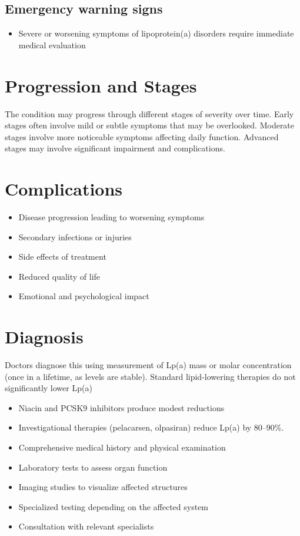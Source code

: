\subsection{Emergency warning signs}
\begin{itemize}[noitemsep]
  \item Severe or worsening symptoms of lipoprotein(a) disorders require immediate medical evaluation
\end{itemize}
\section{Progression and Stages}
The condition may progress through different stages of severity over time. Early stages often involve mild or subtle symptoms that may be overlooked. Moderate stages involve more noticeable symptoms affecting daily function. Advanced stages may involve significant impairment and complications.
\section{Complications}
\begin{itemize}[noitemsep]
  \item Disease progression leading to worsening symptoms
  \item Secondary infections or injuries
  \item Side effects of treatment
  \item Reduced quality of life
  \item Emotional and psychological impact
\end{itemize}
\section{Diagnosis}
Doctors diagnose this using measurement of Lp(a) mass or molar concentration (once in a lifetime, as levels are stable). Standard lipid-lowering therapies do not significantly lower Lp(a)

\begin{itemize}[noitemsep]
  \item Niacin and PCSK9 inhibitors produce modest reductions
  \item Investigational therapies (pelacarsen, olpasiran) reduce Lp(a) by 80--90\%.
  \item Comprehensive medical history and physical examination
  \item Laboratory tests to assess organ function
  \item Imaging studies to visualize affected structures
  \item Specialized testing depending on the affected system
  \item Consultation with relevant specialists
\end{itemize}
